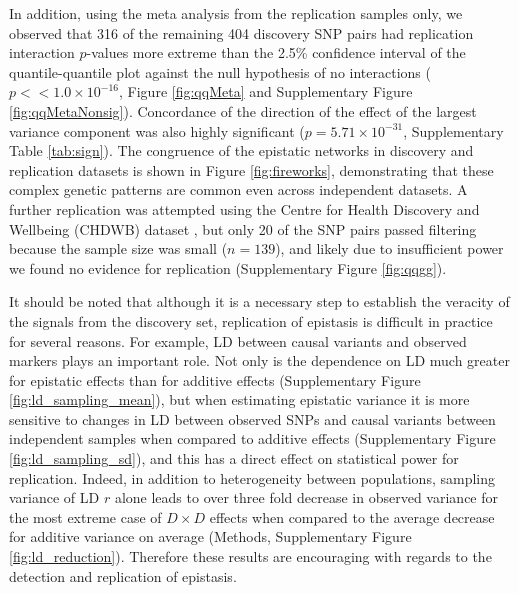 \documentclass{article}
\begin{document}
In addition, using the meta analysis from the replication samples only, we observed that 316 of the remaining 404 discovery SNP pairs had replication interaction $p$-values more extreme than the 2.5\% confidence interval of the quantile-quantile plot against the null hypothesis of no interactions ($p << 1.0 \times 10^{-16}$, Figure \ref{fig:qqMeta} and Supplementary Figure \ref{fig:qqMetaNonsig}). Concordance of the direction of the effect of the largest variance component was also highly significant ($p = 5.71 \times 10^{-31}$, Supplementary Table \ref{tab:sign}). The congruence of the epistatic networks in discovery and replication datasets is shown in Figure \ref{fig:fireworks}, demonstrating that these complex genetic patterns are common even across independent datasets. A further replication was attempted using the Centre for Health Discovery and Wellbeing (CHDWB) dataset \cite{Preininger2013}, but only 20 of the SNP pairs passed filtering because the sample size was small ($n=139$), and likely due to insufficient power we found no evidence for replication (Supplementary Figure \ref{fig:qqgg}).

It should be noted that although it is a necessary step to establish the veracity of the signals from the discovery set, replication of epistasis is difficult in practice for several reasons. For example, LD between causal variants and observed markers plays an important role. Not only is the dependence on LD much greater for epistatic effects than for additive effects (Supplementary Figure \ref{fig:ld_sampling_mean}), but when estimating epistatic variance it is more sensitive to changes in LD between observed SNPs and causal variants between independent samples when compared to additive effects (Supplementary Figure \ref{fig:ld_sampling_sd}), and this has a direct effect on statistical power for replication. Indeed, in addition to heterogeneity between populations, sampling variance of LD $r$ alone leads to over three fold decrease in observed variance for the most extreme case of $D \times D$ effects when compared to the average decrease for additive variance on average (Methods, Supplementary Figure \ref{fig:ld_reduction}). Therefore these results are encouraging with regards to the detection and replication of epistasis.
\end{document}
